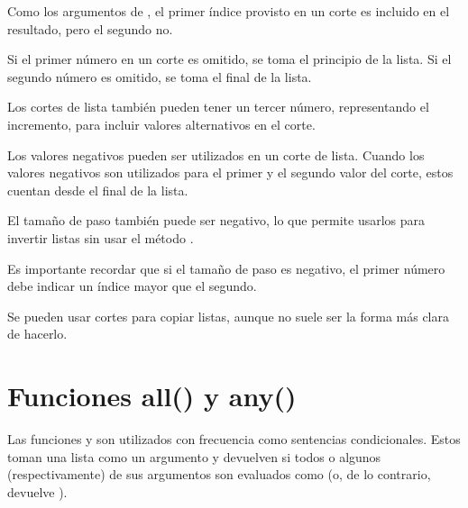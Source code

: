 
Como los argumentos de , el primer índice provisto en un corte es incluido en el resultado, pero el segundo no.

Si el primer número en un corte es omitido, se toma el principio de la lista.
Si el segundo número es omitido, se toma el final de la lista.


Los cortes de lista también pueden tener un tercer número, representando el incremento, para incluir valores alternativos en el corte.


Los valores negativos pueden ser utilizados en un corte de lista.
Cuando los valores negativos son utilizados para el primer y el segundo valor del corte, estos cuentan desde el final de la lista.


El tamaño de paso también puede ser negativo, lo que permite usarlos para invertir listas sin usar el método .


Es importante recordar que si el tamaño de paso es negativo, el primer número debe indicar un índice mayor que el segundo.

Se pueden usar cortes para copiar listas, aunque no suele ser la forma más clara de hacerlo.


\section{Funciones all() y any()}

Las funciones  y  son utilizados con frecuencia como sentencias condicionales.
Estos toman una lista como un argumento y devuelven  si todos o algunos (respectivamente) de sus argumentos son evaluados como  (o, de lo contrario, devuelve ).


